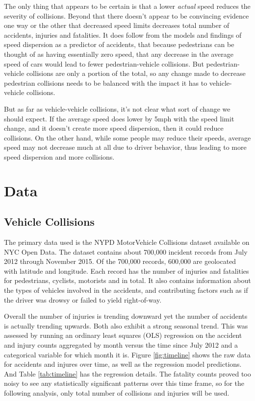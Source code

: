 \documentclass[10pt,journal,compsoc]{IEEEtran}
\begin{document}
The only thing that appears to be certain is that a lower \textit{actual} speed reduces the severity of collisions.  Beyond that there doesn't appear to be convincing evidence one way or the other that decreased speed limits decreases total number of accidents, injuries and fatalities.  It does follow from the models and findings of speed dispersion as a predictor of accidents, that because pedestrians can be thought of  as having essentially zero speed, that any decrease in the average speed of cars would lead to fewer pedestrian-vehicle collisions.  But pedestrian-vehicle collisions are only a portion of the total, so any change made to decrease pedestrian collisions needs to be balanced with the impact it has to vehicle-vehicle collisions.

But as far as vehicle-vehicle collisions, it's not clear what sort of change we should expect.  If the average speed does lower by 5mph with the speed limit change, and it doesn't create more speed dispersion, then it could reduce collisions.  On the other hand, while some people may reduce their speeds, average speed may not decrease much at all due to driver behavior, thus leading to more speed dispersion and more collisions.  




\section{Data}

\subsection{Vehicle Collisions}

The primary data used is the NYPD MotorVehicle Collisions dataset available on NYC Open Data\cite{crashdata}.  The dataset contains about 700,000 incident records from July 2012 through November 2015.  Of the 700,000 records, 600,000 are geolocated with latitude and longitude.  Each record has the number of injuries and fatalities for pedestrians, cyclists, motorists and in total.  It also contains information about the types of vehicles involved in the accidents, and contributing factors such as if the driver was drowsy or failed to yield right-of-way.

Overall the number of injuries is trending downward yet the number of accidents is actually trending upwards. Both also exhibit a strong seasonal trend. This was assessed by running an ordinary least squares (OLS) regression on the accident and injury counts aggregated by month versus the time since July 2012 and a categorical variable for which month it is. Figure \ref{fig:timeline} shows the raw data for accidents and injures over time, as well as the regression model predictions. And Table \ref{tab:timeline} has the regression details. The fatality counts proved too noisy to see any statistically significant patterns over this time frame, so for the following analysis, only total number of collisions and injuries will be used.
\end{document}
